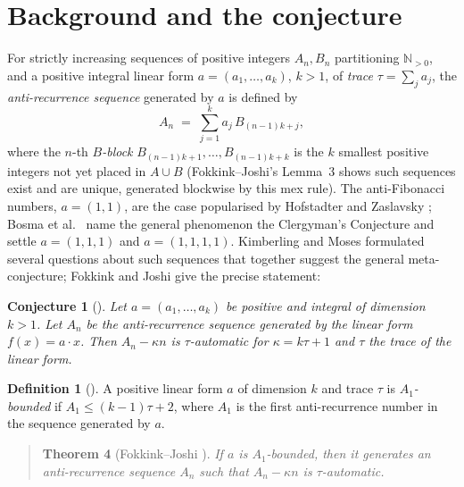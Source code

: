 \documentclass[10pt,reqno]{amsart}
\theoremstyle{plain}
\newtheorem{conjecture}[theorem]{Conjecture}
\theoremstyle{definition}
\newtheorem{definition}[theorem]{Definition}
\theoremstyle{remark}
\numberwithin{theorem}{section}
\newcommand{\N}{\mathbb{N}}
\begin{document}
\maketitle

\section{Background and the conjecture}
\label{sec:bg}

For strictly increasing sequences of positive integers $A_n,B_n$ partitioning $\N_{>0}$, and a
positive integral linear form $a=(a_1,\dots,a_k)$, $k>1$, of \emph{trace} $\tau=\sum_j a_j$, the
\emph{anti-recurrence sequence} generated by $a$ is defined by
\[
  A_n \;=\; \sum_{j=1}^{k} a_j\, B_{(n-1)k+j},
\]
where the $n$-th \emph{$B$-block} $B_{(n-1)k+1},\dots,B_{(n-1)k+k}$ is the $k$ smallest
positive integers not yet placed in $A\cup B$ (Fokkink--Joshi's Lemma~3 shows such sequences
exist and are unique, generated blockwise by this mex rule). The anti-Fibonacci numbers,
$a=(1,1)$, are the case popularised by Hofstadter and Zaslavsky \cite{Zaslavsky}; Bosma et al.\
\cite{Bosma} name the general phenomenon the Clergyman's Conjecture and settle $a=(1,1,1)$ and
$a=(1,1,1,1)$. Kimberling and Moses \cite{KimberlingMoses} formulated several questions about
such sequences that together suggest the general meta-conjecture; Fokkink and Joshi \cite{FJ}
give the precise statement:

\begin{conjecture}[{\cite[Conj.~2]{FJ}}]
\label{conj2}
Let $a=(a_1,\dots,a_k)$ be positive and integral of dimension $k>1$. Let $A_n$ be the
anti-recurrence sequence generated by the linear form $f(x)=a\cdot x$. Then $A_n-\kappa n$ is
$\tau$-automatic for $\kappa=k\tau+1$ and $\tau$ the trace of the linear form.
\end{conjecture}

\begin{definition}[{\cite[Def.~1]{FJ}}]
\label{def:a1bdd}
A positive linear form $a$ of dimension $k$ and trace $\tau$ is \emph{$A_1$-bounded} if
$A_1\le(k-1)\tau+2$, where $A_1$ is the first anti-recurrence number in the sequence generated
by $a$.
\end{definition}

\begin{quote}
\textbf{Theorem 4} (Fokkink--Joshi \cite{FJ}). \emph{If $a$ is $A_1$-bounded, then it generates
an anti-recurrence sequence $A_n$ such that $A_n-\kappa n$ is $\tau$-automatic.}
\end{quote}
\end{document}
